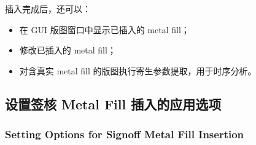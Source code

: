 插入完成后，还可以：
\begin{itemize}
  \item 在 GUI 版图窗口中显示已插入的 metal fill；
  \item 修改已插入的 metal fill；
  \item 对含真实 metal fill 的版图执行寄生参数提取，用于时序分析。
\end{itemize}

\subsection{设置签核 Metal Fill 插入的应用选项}
\subsubsection*{Setting Options for Signoff Metal Fill Insertion}


